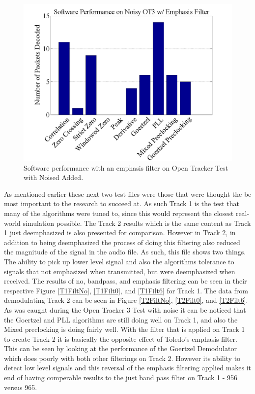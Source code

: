 \begin{figure}
  \centering
	\includegraphics[width=0.75\linewidth]{images/SoftwarePerformanceonNoisyOT3wEmphasisFilter.png} 
	\caption{Software performance with an emphasis filter on Open Tracker Test with Noised Added.}
   \label{OTNoiseFilt6}
\end{figure}

As mentioned earlier these next two test files were those that were thought the be most important to the research to succeed at. As such Track 1 is the test that many of the algorithms were tuned to, since this would represent the closest real-world simulation possible. The Track 2 results which is the same content as Track 1 just deemphasized is also presented for comparison. However in Track 2, in addition to being deemphasized the process of doing this filtering also reduced the magnitude of the signal in the audio file. As such, this file shows two things. The ability to pick up lower level signal and also the algorithms tolerance to signals that not emphasized when transmitted, but were deemphasized when received. The results of no, bandpass, and emphasis filtering can be seen in their respective Figure \ref{T1FiltNo}, \ref{T1Filt0}, and \ref{T1Filt6} for Track 1. The data from demodulating Track 2 can be seen in Figure \ref{T2FiltNo}, \ref{T2Filt0}, and \ref{T2Filt6}. As was caught during the Open Tracker 3 Test with noise it can be noticed that the Goertzel and PLL algorithms are still doing well on Track 1, and also the Mixed preclocking is doing fairly well. With the filter that is applied on Track 1 to create Track 2 it is basically the opposite effect of Toledo's emphasis filter. This can be seen by looking at the performance of the Goertzel Demodulator which does poorly with both other filterings on Track 2. However its ability to detect low level signals and this reversal of the emphasis filtering applied makes it end of having comperable results to the just band pass filter on Track 1 - 956 versus 965. 

